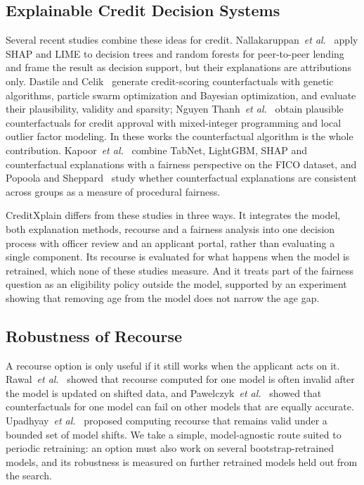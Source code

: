 \subsection{Explainable Credit Decision Systems}
Several recent studies combine these ideas for credit. Nallakaruppan~\emph{et al.}~\cite{nallakaruppan2024risks}
apply SHAP and LIME to decision trees and random forests for peer-to-peer lending and frame the result as decision
support, but their explanations are attributions only. Dastile and Celik~\cite{dastile2024counterfactual} generate
credit-scoring counterfactuals with genetic algorithms, particle swarm optimization and Bayesian optimization, and
evaluate their plausibility, validity and sparsity; Nguyen Thanh~\emph{et al.}~\cite{nguyen2025milp} obtain plausible
counterfactuals for credit approval with mixed-integer programming and local outlier factor modeling. In these works
the counterfactual algorithm is the whole contribution. Kapoor~\emph{et al.}~\cite{kapoor2026fico} combine TabNet,
LightGBM, SHAP and counterfactual explanations with a fairness perspective on the FICO dataset, and Popoola and
Sheppard~\cite{popoola2026fair} study whether counterfactual explanations are consistent across groups as a measure of
procedural fairness.

CreditXplain differs from these studies in three ways. It integrates the model, both explanation methods, recourse and
a fairness analysis into one decision process with officer review and an applicant portal, rather than evaluating a
single component. Its recourse is evaluated for what happens when the model is retrained, which none of these studies
measure. And it treats part of the fairness question as an eligibility policy outside the model, supported by an
experiment showing that removing age from the model does not narrow the age gap.

\subsection{Robustness of Recourse}
A recourse option is only useful if it still works when the applicant acts on it. Rawal~\emph{et al.}~\cite{rawal2020shift}
showed that recourse computed for one model is often invalid after the model is updated on shifted data, and
Pawelczyk~\emph{et al.}~\cite{pawelczyk2020multiplicity} showed that counterfactuals for one model can fail on other
models that are equally accurate. Upadhyay~\emph{et al.}~\cite{upadhyay2021robust} proposed computing recourse that
remains valid under a bounded set of model shifts. We take a simple, model-agnostic route suited to periodic
retraining: an option must also work on several bootstrap-retrained models, and its robustness is measured on
further retrained models held out from the search.


